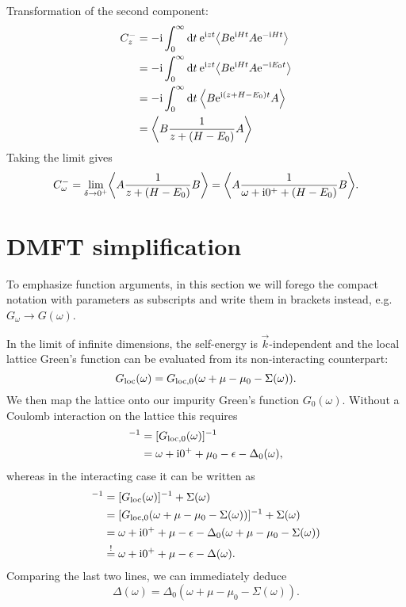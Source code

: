 Transformation of the second component:
\begin{align}
    C^-_z
     & =
    -\mi \int_0^\infty \md t \>
    \me^{\mi zt} \expval*{B \me^{\mi Ht} A \me^{-\mi Ht}}   \\
     & =
    -\mi \int_0^\infty \md t \>
    \me^{\mi zt} \expval*{B \me^{\mi Ht} A \me^{-\mi E_0t}} \\
     & =
    -\mi \int_0^\infty \md t \>
    \expval*{B \me^{\mi(z + H - E_0)t} A}                   \\
     & =
    \expval*{B \frac{1}{z + (H - E_0)} A}
\end{align}
Taking the limit gives
\begin{equation}
    C^-_\omega
    =
    \lim_{\delta\to0^+} \expval*{A \frac{1}{z + (H - E_0)} B}
    =
    \expval*{A \frac{1}{\omega + \mi0^+ + (H - E_0)} B}.
\end{equation}

\section{DMFT simplification}%
\label{app:dmft-simplification}

To emphasize function arguments,
in this section we will forego the compact notation with parameters as subscripts
and write them in brackets instead,
e.g.\ $G_\omega \to G(\omega)$.

In the limit of infinite dimensions, the self-energy is $\vec{k}$-independent
and the local lattice Green's function can be evaluated from
its non-interacting counterpart:
\begin{equation}
    G_{\mathrm{loc}}(\omega)
    =
    G_{\mathrm{loc},0}(\omega + \mu - \mu_0 - \Sigma(\omega)).
\end{equation}
We then map the lattice onto our impurity Green's function $G_0(\omega)$.
Without a Coulomb interaction on the lattice this requires
\begin{align}
    [G_0(\omega)]^{-1}
     & =
    [G_{\mloc,0}(\omega)]^{-1} \\
     & =
    \omega + \mi0^+ + \mu_0 - \epsilon - \Delta_0(\omega),
\end{align}
whereas in the interacting case it can be written as
\begin{align}
    [G_0(\omega)]^{-1}
     & =
    [G_{\mloc}(\omega)]^{-1} + \Sigma(\omega)                                          \\
     & =
    [G_{\mloc,0}(\omega + \mu - \mu_0 - \Sigma(\omega))]^{-1} + \Sigma(\omega)         \\
     & =
    \omega + \mi0^+ + \mu - \epsilon - \Delta_0(\omega + \mu - \mu_0 - \Sigma(\omega)) \\
     & \stackrel{!}{=}
    \omega + \mi0^+ + \mu - \epsilon - \Delta(\omega).
\end{align}
Comparing the last two lines, we can immediately deduce
\begin{equation}
    \Delta(\omega) = \Delta_0(\omega + \mu - \mu_0 - \Sigma(\omega)).
\end{equation}
